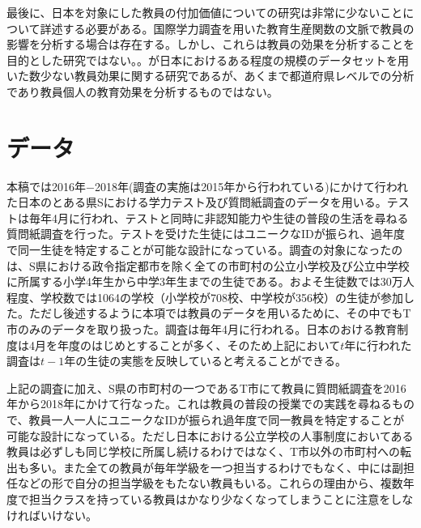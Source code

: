 \documentclass[a4paper,12pt]{article}
\begin{document}
最後に、日本を対象にした教員の付加価値についての研究は非常に少ないことについて詳述する必要がある。国際学力調査を用いた教育生産関数の文脈で教員の影響を分析する場合は存在する\citep{hojo2012factors, hojo2012determinants}。しかし、これらは教員の効果を分析することを目的とした研究ではない。。\cite{二木美苗2017子ども}が日本におけるある程度の規模のデータセットを用いた数少ない教員効果に関する研究であるが、あくまで都道府県レベルでの分析であり教員個人の教育効果を分析するものではない。




\section{データ\label{data}}
本稿では2016年−2018年(調査の実施は2015年から行われている)にかけて行われた日本のとある県Sにおける学力テスト及び質問紙調査のデータを用いる。テストは毎年4月に行われ、テストと同時に非認知能力や生徒の普段の生活を尋ねる質問紙調査を行った。テストを受けた生徒にはユニークなIDが振られ、過年度で同一生徒を特定することが可能な設計になっている。調査の対象になったのは、S県における政令指定都市を除く全ての市町村の公立小学校及び公立中学校に所属する小学4年生から中学3年生までの生徒である。およそ生徒数では30万人程度、学校数では1064の学校（小学校が708校、中学校が356校）の生徒が参加した。ただし後述するように本項では教員のデータを用いるために、その中でもT市のみのデータを取り扱った。調査は毎年4月に行われる。日本のおける教育制度は4月を年度のはじめとすることが多く、そのため上記において$t$年に行われた調査は$t-1$年の生徒の実態を反映していると考えることができる。


上記の調査に加え、S県の市町村の一つであるT市にて教員に質問紙調査を2016年から2018年にかけて行なった。これは教員の普段の授業での実践を尋ねるもので、教員一人一人にユニークなIDが振られ過年度で同一教員を特定することが可能な設計になっている。ただし日本における公立学校の人事制度においてある教員は必ずしも同じ学校に所属し続けるわけではなく、T市以外の市町村への転出も多い。また全ての教員が毎年学級を一つ担当するわけでもなく、中には副担任などの形で自分の担当学級をもたない教員もいる。これらの理由から、複数年度で担当クラスを持っている教員はかなり少なくなってしまうことに注意をしなければいけない。
\end{document}
